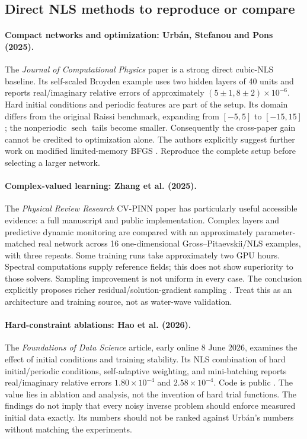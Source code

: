 \subsection{Direct NLS methods to reproduce or compare}
\paragraph{Compact networks and optimization: Urb\'an, Stefanou and Pons (2025).}
The \emph{Journal of Computational Physics} paper is a strong direct
cubic-NLS baseline. Its self-scaled Broyden example uses two hidden layers
of 40 units and reports real/imaginary relative errors of approximately
$(5\pm1,8\pm2)\times10^{-6}$. Hard initial conditions and periodic features
are part of the setup. Its domain differs from the original Raissi
benchmark, expanding from $[-5,5]$ to $[-15,15]$; the nonperiodic
$\operatorname{sech}$ tails become smaller. Consequently the cross-paper
gain cannot be credited to optimization alone. The authors explicitly
suggest further work on modified limited-memory BFGS
\cite{urban}. Reproduce the complete setup before selecting a larger network.

\paragraph{Complex-valued learning: Zhang et al. (2025).}
The \emph{Physical Review Research} CV-PINN paper has particularly useful
accessible evidence: a full manuscript and public implementation. Complex
layers and predictive dynamic monitoring are compared with an approximately
parameter-matched real network across 16 one-dimensional
Gross--Pitaevskii/NLS examples, with three repeats. Some training runs take
approximately two GPU hours. Spectral computations supply reference fields;
this does not show superiority to those solvers. Sampling improvement is
not uniform in every case. The conclusion explicitly proposes richer
residual/solution-gradient sampling \cite{cvpinn}. Treat this as an
architecture and training source, not as water-wave validation.

\paragraph{Hard-constraint ablations: Hao et al. (2026).}
The \emph{Foundations of Data Science} article, early online 8 June 2026,
examines the effect of initial conditions and training stability. Its NLS
combination of hard initial/periodic conditions, self-adaptive weighting,
and mini-batching reports real/imaginary relative errors
$1.80\times10^{-4}$ and $2.58\times10^{-4}$. Code is public
\cite{hardic}. The value lies in ablation and analysis, not the invention of
hard trial functions. The findings do not imply that every noisy inverse
problem should enforce measured initial data exactly. Its numbers should
not be ranked against Urb\'an's numbers without matching the experiments.

